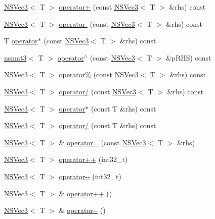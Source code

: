 \begin{DoxyCompactItemize}
\item 
\hyperlink{structNSVec3}{N\-S\-Vec3}$<$ T $>$ \hyperlink{structNSVec3_ae6c4218470faa3e3b2349d16e95f6fbe}{operator+} (const \hyperlink{structNSVec3}{N\-S\-Vec3}$<$ T $>$ \&rhs) const 
\item 
\hyperlink{structNSVec3}{N\-S\-Vec3}$<$ T $>$ \hyperlink{structNSVec3_a7e4cb5f5a5bf946d00f87c4de96d673c}{operator-\/} (const \hyperlink{structNSVec3}{N\-S\-Vec3}$<$ T $>$ \&rhs) const 
\item 
T \hyperlink{structNSVec3_abe685cda075026472781d52f4e264c5b}{operator$\ast$} (const \hyperlink{structNSVec3}{N\-S\-Vec3}$<$ T $>$ \&rhs) const 
\item 
\hyperlink{structnsmat3}{nsmat3}$<$ T $>$ \hyperlink{structNSVec3_ab6f6259ee7b0b99e833e36fdc77b1ab7}{operator$^\wedge$} (const \hyperlink{structNSVec3}{N\-S\-Vec3}$<$ T $>$ \&p\-R\-H\-S) const 
\item 
\hyperlink{structNSVec3}{N\-S\-Vec3}$<$ T $>$ \hyperlink{structNSVec3_a8a2ab855ec4ab2ddee05e14c28cb7fde}{operator\%} (const \hyperlink{structNSVec3}{N\-S\-Vec3}$<$ T $>$ \&rhs) const 
\item 
\hyperlink{structNSVec3}{N\-S\-Vec3}$<$ T $>$ \hyperlink{structNSVec3_a5170ffb9370512a26b86d22ffd108324}{operator/} (const \hyperlink{structNSVec3}{N\-S\-Vec3}$<$ T $>$ \&rhs) const 
\item 
\hyperlink{structNSVec3}{N\-S\-Vec3}$<$ T $>$ \hyperlink{structNSVec3_a52ee9411a21ca500281529411bce3613}{operator$\ast$} (const T \&rhs) const 
\item 
\hyperlink{structNSVec3}{N\-S\-Vec3}$<$ T $>$ \hyperlink{structNSVec3_afe28c2f0197f70d1ac5596f695000b9b}{operator/} (const T \&rhs) const 
\item 
\hyperlink{structNSVec3}{N\-S\-Vec3}$<$ T $>$ \& \hyperlink{structNSVec3_a95dec9ce9895bba303f53a240543db05}{operator=} (const \hyperlink{structNSVec3}{N\-S\-Vec3}$<$ T $>$ \&rhs)
\item 
\hyperlink{structNSVec3}{N\-S\-Vec3}$<$ T $>$ \hyperlink{structNSVec3_a47ecc5cf064696c8b3555bcb30a795e5}{operator++} (int32\-\_\-t)
\item 
\hyperlink{structNSVec3}{N\-S\-Vec3}$<$ T $>$ \hyperlink{structNSVec3_adcf6e712683a242e2ca023de4f8e0dbe}{operator-\/-\/} (int32\-\_\-t)
\item 
\hyperlink{structNSVec3}{N\-S\-Vec3}$<$ T $>$ \& \hyperlink{structNSVec3_a64980ad9e464b23e321849ada4f2990b}{operator++} ()
\item 
\hyperlink{structNSVec3}{N\-S\-Vec3}$<$ T $>$ \& \hyperlink{structNSVec3_a024783363f9a5abea8a8620a3d2c4218}{operator-\/-\/} ()

\end{DoxyCompactItemize}
